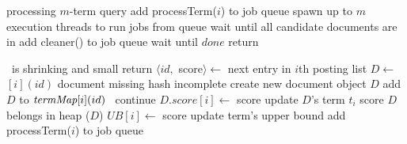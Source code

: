 
\begin{algorithm*}[htb]
\small
\begin{multicols}{2}
\begin{algorithmic}[1]
 \Comment processing $m$-term query
\State add {\sc processTerm($i$)} to job queue \label{l:par-init-job}
\EndFor
\State spawn up to $m$ execution threads to run jobs from queue\label{l:start-threads}
\State wait until \RAStop
	\Comment all candidate documents are in \DMap
\State add {\sc cleaner()} to job queue %
\State wait until $done$
\State return \DHeap \label{l:par-end}
%

\Statex 
{} 
	\If{\RAStop\, $\wedge\, |\DMap | < \Phi $}  
		\Comment \DMap\ is shrinking and small
		\If{\TMap[i]=\DMap} \label{l:hash-start}
  	\EndIf \EndIf \label{l:hash-end}
		 return \EndIf
    		\State $\langle id,$ score$\rangle \leftarrow$ next entry in $i$th posting list
		\State $D \leftarrow$ \TMap$[i](id)$
 	  		 \Comment document missing 
 	  			\If{$\neg$\RAStop} \Comment hash incomplete
		 			\State create new document object $D$
 					\State add $D$ to $\textit{termMap}[i](id)$
				\Else\ continue
				\EndIf
    			\EndIf
        			\State $D.score[i] \leftarrow$ score \Comment update $D$'s term $t_i$ score
			\Comment $D$ belongs in heap
				($D$)
			\EndIf	
	\EndFor %
	\State $UB[i] \leftarrow$ score \Comment update term's upper bound \label{l:thread-update-ub}    
	\State add {\sc processTerm($i$)} to job queue \label{l:new-task}
\EndProcedure



\end{algorithmic}
\end{multicols}
\end{algorithm*}
